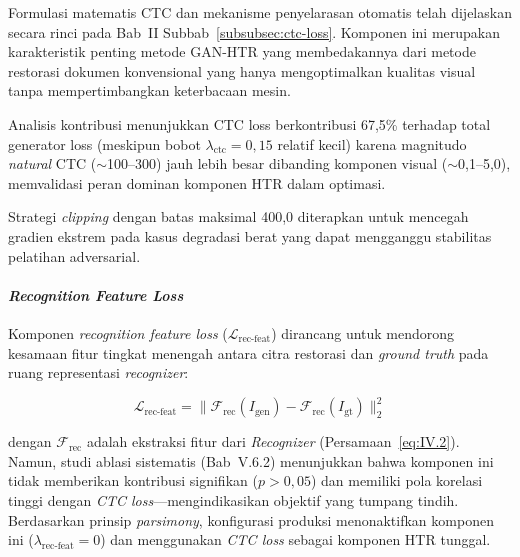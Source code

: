 \documentclass[12pt,a4paper]{article}
\begin{document}
Formulasi matematis CTC dan mekanisme penyelarasan otomatis telah dijelaskan secara rinci pada Bab~II Subbab~\ref{subsubsec:ctc-loss}. Komponen ini merupakan karakteristik penting metode GAN-HTR yang membedakannya dari metode restorasi dokumen konvensional yang hanya mengoptimalkan kualitas visual tanpa mempertimbangkan keterbacaan mesin.

Analisis kontribusi menunjukkan CTC loss berkontribusi 67,5\% terhadap total generator loss (meskipun bobot $\lambda_{\text{ctc}}=0,15$ relatif kecil) karena magnitudo \textit{natural} CTC ($\sim$100--300) jauh lebih besar dibanding komponen visual ($\sim$0,1--5,0), memvalidasi peran dominan komponen HTR dalam optimasi.

Strategi \textit{clipping} dengan batas maksimal 400,0 diterapkan untuk mencegah gradien ekstrem pada kasus degradasi berat yang dapat mengganggu stabilitas pelatihan adversarial.

\paragraph{\textit{Recognition Feature Loss}}

Komponen \textit{recognition feature loss} ($\mathcal{L}_{\text{rec-feat}}$) dirancang untuk mendorong kesamaan fitur tingkat menengah antara citra restorasi dan \textit{ground truth} pada ruang representasi \textit{recognizer}:

\begin{equation}
  \mathcal{L}_{\text{rec-feat}} = \|\mathcal{F}_{\text{rec}}(I_{\text{gen}}) - \mathcal{F}_{\text{rec}}(I_{\text{gt}})\|_2^2
  \label{eq:IV.3}
\end{equation}

\noindent dengan $\mathcal{F}_{\text{rec}}$ adalah ekstraksi fitur dari \textit{Recognizer} (Persamaan~\ref{eq:IV.2}). Namun, studi ablasi sistematis (Bab~V.6.2) menunjukkan bahwa komponen ini tidak memberikan kontribusi signifikan ($p>0,05$) dan memiliki pola korelasi tinggi dengan \textit{CTC loss}---mengindikasikan objektif yang tumpang tindih. Berdasarkan prinsip \textit{parsimony}, konfigurasi produksi menonaktifkan komponen ini ($\lambda_{\text{rec-feat}}=0$) dan menggunakan \textit{CTC loss} sebagai komponen HTR tunggal.
\end{document}
